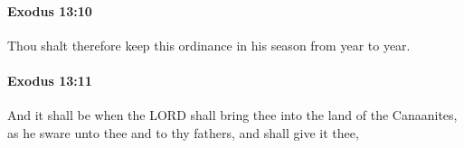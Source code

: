 		\paragraph{Exodus 13:10} %
			\label{EXODUS-13-10}

			Thou shalt therefore keep this ordinance in his season from year to year.


		\paragraph{Exodus 13:11} %
			\label{EXODUS-13-11}

			And it shall be when the LORD shall bring thee into the land of the Canaanites, as he sware unto thee and to thy fathers, and shall give it thee,


